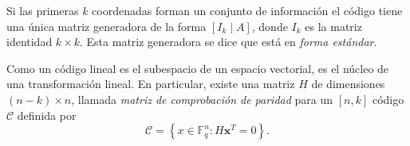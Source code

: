Si las primeras \(k\) coordenadas forman un conjunto de información el código tiene una única matriz generadora de la forma \([I_k \mid A]\), donde \(I_k\) es la matriz identidad \(k \times k\). Esta matriz generadora se dice que está en \textit{forma estándar}.

Como un código lineal es el subespacio de un espacio vectorial, es el núcleo de una transformación lineal. En particular, existe una matriz \(H\) de dimensiones \((n - k) \times n\), llamada \textit{matriz de comprobación de paridad} para un \([n, k]\) código \(\mathcal C\) definida por \begin{equation}
  \mathcal C = \left\{x \in \mathbb F_q^n : H \boldsymbol x^T = 0 \right\}.
\end{equation}
